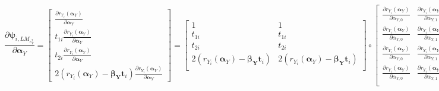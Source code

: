 \documentclass[]{article}
\begin{document}
{\small
{\[
\frac{\partial \pmb{\psi}_{i,LM_{r^2_Y}}}{\partial \pmb{\alpha}_Y} = 
	\begin{bmatrix}
		\frac{\partial r_{Y_i}(\pmb{\alpha}_Y)}{\partial \pmb{\alpha}_Y} \\
		t_{1i}  \frac{\partial r_{Y_i}(\pmb{\alpha}_Y)}{\partial \pmb{\alpha}_Y}\\
		t_{2i}  \frac{\partial r_{Y_i}(\pmb{\alpha}_Y)}{\partial \pmb{\alpha}_Y}\\
		2(r_{Y_i}(\pmb{\alpha}_Y) - \pmb{\beta_{Y}}\pmb{t}_i) \frac{\partial r_{Y_i}(\pmb{\alpha}_Y)}{\partial \pmb{\alpha}_Y}
 	\end{bmatrix}=
	\begin{bmatrix}
		1 & 1\\
		t_{1i} & t_{1i} \\
		t_{2i} & t_{2i} \\
		2(r_{Y_i}(\pmb{\alpha}_Y) - \pmb{\beta_{Y}}\pmb{t}_i) & 2(r_{Y_i}(\pmb{\alpha}_Y) - \pmb{\beta_{Y}}\pmb{t}_i)\\
 	\end{bmatrix} 
  \circ
	\begin{bmatrix}
		\frac{\partial r_{Y_i}(\pmb{\alpha}_Y)}{\partial \alpha_{Y,0}} & \frac{\partial r_{Y_i}(\pmb{\alpha}_Y)}{\partial \alpha_{Y,1}}\\
		\frac{\partial r_{Y_i}(\pmb{\alpha}_Y)}{\partial \alpha_{Y,0}} & \frac{\partial r_{Y_i}(\pmb{\alpha}_Y)}{\partial \alpha_{Y,1}}\\
		\frac{\partial r_{Y_i}(\pmb{\alpha}_Y)}{\partial \alpha_{Y,0}} & \frac{\partial r_{Y_i}(\pmb{\alpha}_Y)}{\partial \alpha_{Y,1}}\\
		\frac{\partial r_{Y_i}(\pmb{\alpha}_Y)}{\partial \alpha_{Y,0}} & \frac{\partial r_{Y_i}(\pmb{\alpha}_Y)}{\partial \alpha_{Y,1}}\\
 	\end{bmatrix} 
\]

}}
\end{document}
